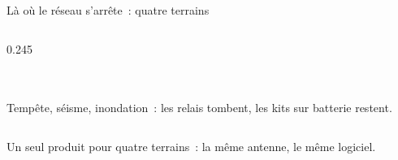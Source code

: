 \begin{frame}{Là où le réseau s'arrête~: quatre terrains}
\begin{columns}[T]
\begin{column}{0.245\textwidth}
      \begin{carte}[height=4.0cm,valign=top]
        \centering
        \\[3pt]
        \\[3pt]
        {\footnotesize Tempête, séisme, inondation~: les relais tombent, les kits sur batterie restent.}
      \end{carte}
    \end{column}
  \end{columns}
  \vspace{0.15cm}
  \begin{pointcle}\centering\footnotesize
    Un seul produit pour quatre terrains~: la même antenne, le même logiciel.
  \end{pointcle}
\end{frame}

